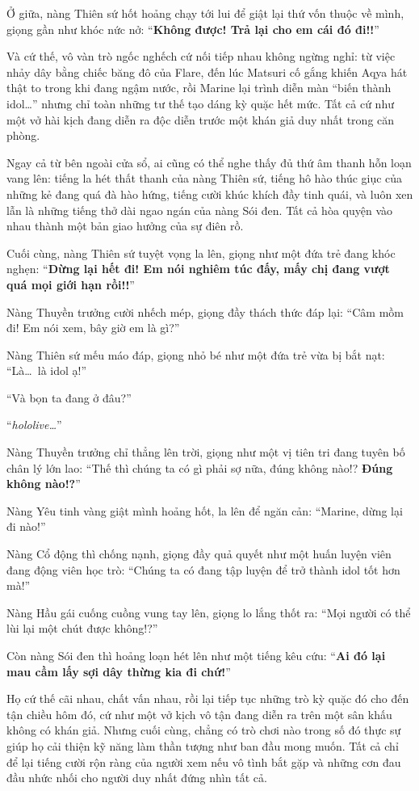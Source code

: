 \documentclass[../main.tex]{subfiles}
\begin{document}
Ở giữa, nàng Thiên sứ hốt hoảng chạy tới lui để giật lại thứ vốn thuộc về mình, giọng gần như khóc nức nở: ``\textbf{Không được! Trả lại cho em cái đó đi!!}''

\il

Và cứ thế, vô vàn trò ngốc nghếch cứ nối tiếp nhau không ngừng nghỉ: từ việc nhảy dây bằng chiếc băng đô của Flare, đến lúc Matsuri cố gắng khiến Aqya hát thật to trong khi đang ngậm nước, rồi Marine lại trình diễn màn ``biến thành idol\dots'' nhưng chỉ toàn những tư thế tạo dáng kỳ quặc hết mức. Tất cả cứ như một vở hài kịch đang diễn ra độc diễn trước một khán giả duy nhất trong căn phòng.

Ngay cả từ bên ngoài cửa sổ, ai cũng có thể nghe thấy đủ thứ âm thanh hỗn loạn vang lên: tiếng la hét thất thanh của nàng Thiên sứ, tiếng hô hào thúc giục của những kẻ đang quá đà hào hứng, tiếng cười khúc khích đầy tinh quái, và luôn xen lẫn là những tiếng thở dài ngao ngán của nàng Sói đen. Tất cả hòa quyện vào nhau thành một bản giao hưởng của sự điên rồ.

Cuối cùng, nàng Thiên sứ tuyệt vọng la lên, giọng như một đứa trẻ đang khóc nghẹn: ``\textbf{Dừng lại hết đi! Em nói nghiêm túc đấy, mấy chị đang vượt quá mọi giới hạn rồi!!}''

Nàng Thuyền trưởng cười nhếch mép, giọng đầy thách thức đáp lại: ``Câm mồm đi! Em nói xem, bây giờ em là gì?''

Nàng Thiên sứ mếu máo đáp, giọng nhỏ bé như một đứa trẻ vừa bị bắt nạt: ``Là\dots\ là idol ạ!''

``Và bọn ta đang ở đâu?''

``\textit{hololive\dots}''

Nàng Thuyền trưởng chỉ thẳng lên trời, giọng như một vị tiên tri đang tuyên bố chân lý lớn lao: ``Thế thì chúng ta có gì phải sợ nữa, đúng không nào!? \textbf{Đúng không nào!?}''

Nàng Yêu tinh vàng giật mình hoảng hốt, la lên để ngăn cản: ``Marine, dừng lại đi nào!''

Nàng Cổ động thì chống nạnh, giọng đầy quả quyết như một huấn luyện viên đang động viên học trò: ``Chúng ta có đang tập luyện để trở thành idol tốt hơn mà!''

Nàng Hầu gái cuống cuồng vung tay lên, giọng lo lắng thốt ra: ``Mọi người có thể lùi lại một chút được không!?''

Còn nàng Sói đen thì hoảng loạn hét lên như một tiếng kêu cứu: ``\textbf{Ai đó lại mau cầm lấy sợi dây thừng kia đi chứ!}''

Họ cứ thế cãi nhau, chất vấn nhau, rồi lại tiếp tục những trò kỳ quặc đó cho đến tận chiều hôm đó, cứ như một vở kịch vô tận đang diễn ra trên một sân khấu không có khán giả. Nhưng cuối cùng, chẳng có trò chơi nào trong số đó thực sự giúp họ cải thiện kỹ năng làm thần tượng như ban đầu mong muốn. Tất cả chỉ để lại tiếng cười rộn ràng của người xem nếu vô tình bắt gặp và những cơn đau đầu nhức nhối cho người duy nhất đứng nhìn tất cả.
\end{document}
